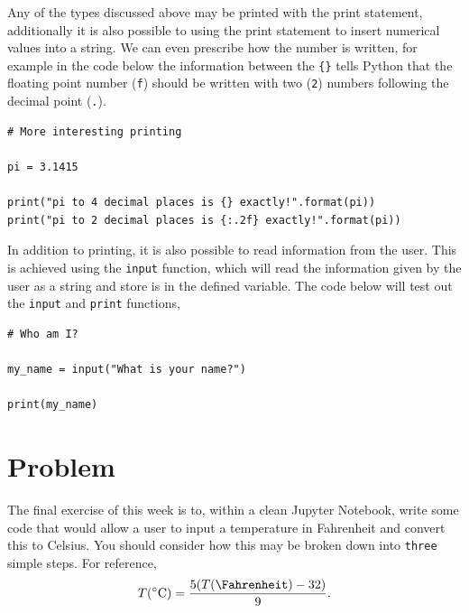 \documentclass[a4paper]{article}
\begin{document}
Any of the types discussed above may be printed with the print statement, additionally it is also possible to using the print statement to insert numerical values into a string.
We can even prescribe how the number is written, for example in the code below the information between the \texttt{\{\}} tells Python that the floating point number (\texttt{f}) should be written with two (\texttt{2}) numbers following the decimal point (\texttt{.}).  
\begin{lstlisting}
# More interesting printing

pi = 3.1415

print("pi to 4 decimal places is {} exactly!".format(pi))
print("pi to 2 decimal places is {:.2f} exactly!".format(pi))
\end{lstlisting}

In addition to printing, it is also possible to read information from the user.
This is achieved using the \texttt{input} function, which will read the information given by the user as a string and store is in the defined variable. 
The code below will test out the \texttt{input} and \texttt{print} functions, 
\begin{lstlisting}
# Who am I?

my_name = input("What is your name?")

print(my_name)
\end{lstlisting}

\section{Problem}

The final exercise of this week is to, within a clean Jupyter Notebook, write some code that would allow a user to input a temperature in Fahrenheit and convert this to Celsius. 
You should consider how this may be broken down into \texttt{three} simple steps.
For reference, 
\begin{equation}
	T (\si{\celsius}) = \frac{5 ( T(\si{\Fahrenheit}) - 32)}{9}.
\end{equation}



\end{document}
